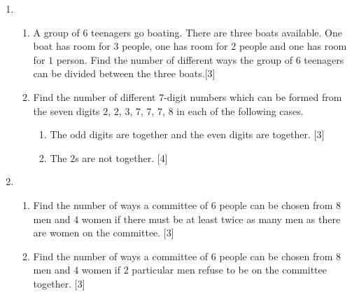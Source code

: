 \documentclass[a4paper]{article}
\begin{document}
\begin{enumerate}
	Freddie arranges these $9$ toys in a line.
	
	\begin{enumerate}[resume,label=(\roman*)]
		\item Find the number of possible arrangements if the buses are all next to each other. \hfill[3]
		\vspace{3cm}
		\item  Find the number of possible arrangements if there is a car at each end of the line and no buses are next to each other. \hfill[3]
		\vspace{3cm}
	\end{enumerate}
	
	
	
	\item  \begin{enumerate}[label=(\roman*)]
		\item A group of $6$ teenagers go boating. There are three boats available. One boat has room for $3$ people, one has room for $2$ people and one has room for $1$ person. Find the number of different ways the group of 6 teenagers can be divided between the three boats.\hfill [3]
		\vspace{2cm}
		\item Find the number of different $7$-digit numbers which can be formed from the seven digits $2$, $2$, $3$, $7$, $7$, $7$, $8$ in each of the following cases.
		\begin{enumerate}[label=(\alph*)]
			\item The odd digits are together and the even digits are together. \hfill [3]
			\vspace{2cm}
			\item The $2$s are not together. \hfill[4]
			\vspace{2cm}
		\end{enumerate}
	\end{enumerate}
	
	
	
	\item  \begin{enumerate}[label=(\roman*)]
		\item Find the number of ways a committee of $6$ people can be chosen from $8$ men and $4$ women if there must be at least twice as many men as there are women on the committee.
		 \hfill[3]
		 \vspace{2cm}
		\item Find the number of ways a committee of $6$ people can be chosen from $8$ men and $4$ women if $2$ particular men refuse to be on the committee together. \hfill[3]
		\vspace{2cm}
		

\end{enumerate}
\end{enumerate}
\end{document}
